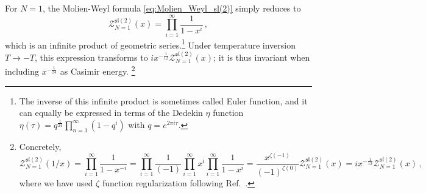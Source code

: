 \documentclass[a4paper,11pt]{article}
\begin{document}
For $N=1$, the Molien-Weyl formula \eqref{eq:Molien_Weyl_sl(2)} simply reduces to
\begin{equation}
	\mathcal{Z}_{N=1}^{\mathfrak{sl}(2)}(x) = \prod_{i=1}^\infty\frac{1}{1-x^i}\,,
\end{equation}
which is an infinite product of geometric series.\footnote{The inverse of this infinite product is sometimes called Euler function, and it can equally be expressed in terms of the Dedekin $\eta$ function $\eta(\tau)=q^{\frac{1}{24}}\prod_{n=1}^\infty(1-q^i)$ with $q=e^{2\pi i \tau}$.}
Under temperature inversion $T\to-T$, this expression transforms to $ix^{-\frac{1}{12}}\mathcal{Z}_{N=1}^{\mathfrak{sl}(2)}(x)$; it is thus invariant when including $x^{-\frac{1}{24}}$ as Casimir energy.%
\footnote{Concretely, 
\begin{equation}
 \mathcal{Z}_{N=1}^{\mathfrak{sl}(2)}(1/x)=\prod_{i=1}^\infty\frac{1}{1-x^{-i}}=\prod_{i=1}^\infty\frac{1}{(-1)}\prod_{i=1}^\infty x^i\prod_{i=1}^\infty\frac{1}{1-x^{i}}=\frac{x^{\zeta(-1)}}{(-1)^{\zeta(0)}}\mathcal{Z}_{N=1}^{\mathfrak{sl}(2)}(x)=ix^{-\frac{1}{12}}\mathcal{Z}_{N=1}^{\mathfrak{sl}(2)}(x)\,,
\end{equation}
where we have used $\zeta$ function regularization following Ref.\ \cite{Basar:2014mha}.
}
\end{document}
